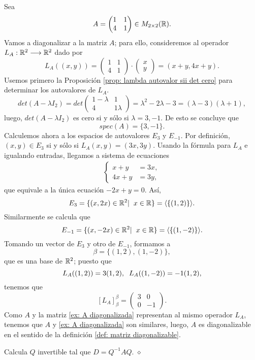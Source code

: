 \begin{ejem}
Sea 
\[
A = \begin{pmatrix}
1 & 1 \\ 4 & 1
\end{pmatrix} \in M_{2 \times 2}(\mathbb{R}).
\]
Vamos a diagonalizar a la matriz $A$; para ello, consideremos
al operador
$L_{A} : \mathbb{R}^{2} \longrightarrow \mathbb{R}^{2}$ dado por
\[
L_{A}((x, y)) = 
 \begin{pmatrix}
1 & 1 \\ 4 & 1
\end{pmatrix} \cdot \begin{pmatrix}
x \\ y
\end{pmatrix} = (x+y, 4x+y).
\]
Usemos primero la Proposición 
\ref{prop: lambda autovalor sii det cero} para determinar los
autovalores de $L_{A}$.
\[
det(A - \lambda I_{2}) = 
det \begin{pmatrix}
1- \lambda & 1 \\ 4 & 1 \lambda
\end{pmatrix} = 
\lambda^{2} - 2 \lambda - 3 = (\lambda - 3) (\lambda + 1),
\]
luego, $det(A- \lambda I_{2})$ es cero si y sólo si 
$\lambda = 3, -1$. De esto se concluye que 
\begin{equation}
	\label{eq: ejemplo spec de A}
	spec(A) = \{ 3, -1 \}.
\end{equation}
Calculemos ahora a los espacios de autovalores $E_{3}$
y $E_{-1}$.
Por definición,
$(x, y) \in E_{3}$ si y sólo si $L_{A}(x, y) = (3x, 3y)$. Usando la
fórmula para $L_{A}$ e igualando entradas, llegamos a sistema de ecuaciones
\begin{align*}
\begin{cases}
x + y & = 3x, \\
4x+y & = 3y,
\end{cases}
\end{align*}
que equivale a la única ecuación $-2x+y = 0$. Así,
\[
E_{3} = \{ (x, 2x) \in \mathbb{R}^{2}  | \hspace{0.2cm} x \in \mathbb{R} \}
= \langle \{ (1, 2) \} \rangle.
\]
Similarmente se calcula que 
\[
E_{-1} = \{ (x, -2x) \in \mathbb{R}^{2}  | \hspace{0.2cm} x \in \mathbb{R} \}
= \langle \{ (1, -2) \} \rangle.
\]
Tomando un vector de $E_{3}$ y otro de $E_{-1}$, formamos a
\[
\beta = \{ (1, 2), (1, -2) \},
\]
que es una base de $\mathbb{R}^{2}$; puesto que 
\[
L_{A}((1, 2)) = 3(1, 2), \hspace{0.2cm}
L_{A}((1, -2)) = -1(1, 2),  
\]
tenemos que
\begin{equation}
	\label{ex: A diagonalizada}
	[L_{A}]_{\beta}^{\beta} = \begin{pmatrix}
3 & 0 \\
0 & -1
\end{pmatrix}.
\end{equation}
Como $A$ y la matriz \eqref{ex: A diagonalizada}
representan al mismo operador $L_{A}$, tenemos que $A$ y 
\eqref{ex: A diagonalizada} son similares, luego, 
$A$ es diagonalizable en el sentido de la 
definición \ref{def: matriz diagonalizable}.

 Calcula $Q$ invertible tal que 
$D = Q^{-1} A Q$. $\diamond$
\end{ejem}

